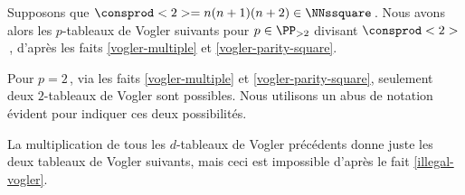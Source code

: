 Supposons que $\consprod<2> = n(n+1)(n+2) \in \NNssquare$\,. Nous avons alors les $p$-tableaux de Vogler suivants pour $p \in \PP_{>2}$ divisant $\consprod<2>$\,, d'après les faits \ref{vogler-multiple} et \ref{vogler-parity-square}.

\begin{center}
\end{center}


Pour $p = 2$\,, via les faits \ref{vogler-multiple} et \ref{vogler-parity-square}, seulement deux $2$-tableaux de Vogler sont possibles. Nous utilisons un abus de notation évident pour indiquer ces deux possibilités.

\begin{center}
\end{center}


La multiplication de tous les $d$-tableaux de Vogler précédents donne juste les deux tableaux de Vogler suivants, mais ceci est impossible d'après le fait \ref{illegal-vogler}.

\begin{center}
\end{center}